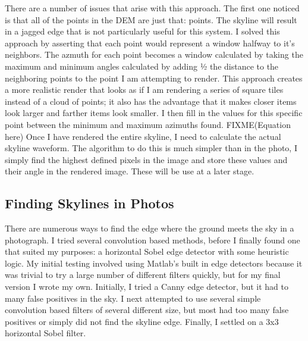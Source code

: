 \documentclass{acm_proc_article-sp}
\begin{document}
There are a number of issues that arise with this approach.  The first one noticed is that all of the points in the DEM are just that: points.  The skyline will result in a jagged edge that is not particularly useful for this system.  I solved this approach by asserting that each point would represent a window halfway to it’s neighbors.  The azmuth for each point becomes a window calculated by taking the maximum and minimum angles calculated by adding ½ the distance to the neighboring points to the point I am attempting to render.  This approach creates a more realistic render that looks as if I am rendering a series of square tiles instead of a cloud of points; it also has the advantage that it makes closer items look larger and farther items look smaller.  I then fill in the values for this specific point between the minimum and maximum azimuths found. FIXME(Equation here)
    Once I have rendered the entire skyline, I need to calculate the actual skyline waveform.  The algorithm to do this is much simpler than in the photo, I simply find the highest defined pixels in the image and store these values and their angle in the rendered image. These will be use at a later stage.

\subsection{Finding Skylines in Photos}
    There are numerous ways to find the edge where the ground meets the sky in a photograph.  I tried several convolution based methods, before I finally found one that suited my purposes:  a horizontal Sobel edge detector with some heuristic logic.  My initial testing involved using Matlab’s built in edge detectors because it was trivial to try a large number of different filters quickly, but for my final version I wrote my own.  Initially, I tried a Canny edge detector, but it had to many false positives in the sky.  I next attempted to use several simple convolution based filters of several different size, but most had too many false positives or simply did not find the skyline edge.  Finally, I settled on a 3x3 horizontal Sobel filter.  
\end{document}
